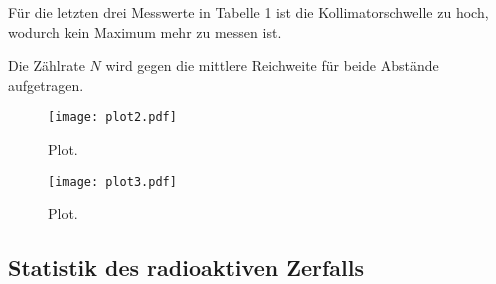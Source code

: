Für die letzten drei Messwerte in Tabelle 1 ist die Kollimatorschwelle zu hoch, wodurch kein Maximum mehr zu messen ist.

Die Zählrate $N$ wird gegen die mittlere Reichweite für beide Abstände aufgetragen.

\begin{figure}
  \centering
  \texttt{[image: plot2.pdf]}
  \caption{Plot.}
  \label{fig:plot}
\end{figure}


\begin{figure}
  \centering
  \texttt{[image: plot3.pdf]}
  \caption{Plot.}
  \label{fig:plot}
\end{figure}





\subsection{Statistik des radioaktiven Zerfalls}
